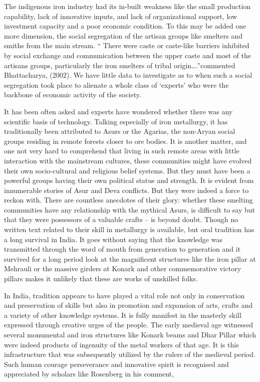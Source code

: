 The indigenous iron industry had its in-built weakness like the small production capability, lack of innovative inputs, and lack of organizational support, low investment capacity and a poor economic condition. To this may be added one more dimension, the social segregation of the artisan groups like smelters and smiths from the main stream. “ There were caste or caste-like barriers inhibited by social exchange and communication between the upper caste and most of the artisans groups, particularly the iron smelters of tribal origin….”commented Bhattacharya, (2002). We have little data to investigate as to when such a social segregation took place to alienate a whole class of `experts' who were the backbone of economic activity of the society. 

It has been often asked and experts have wondered whether there was any scientific basis of technology. Talking especially of iron metallurgy, it has traditionally been attributed to Asurs or the Agarias, the non-Aryan social groups residing in remote forests closer to ore bodies. It is another matter, and one not very hard to comprehend that living in such remote areas with little interaction with the mainstream cultures, these communities might have evolved their own socio-cultural and religious belief systems. But they must have been a powerful groups having their own political status and strength. It is evident from innumerable stories of Asur and Deva conflicts. But they were indeed a force to reckon with. There are countless anecdotes of their glory: whether these smelting communities have any relationship with the mythical Asurs, is difficult to say but that they were possessors of a valuable crafts – is beyond doubt. Though no written text related to their skill in metallurgy is available, but oral tradition has a long survival in India. It goes without saying that the knowledge was transmitted through the word of mouth from generation to generation and it survived for a long period look at the magnificent structures like the iron pillar at Mehrauli or the massive girders at Konark and other commemorative victory pillars makes it unlikely that these are works of unskilled folks.

In India, tradition appears to have played a vital role not only in conservation and preservation of skills but also in promotion and expansion of arts, crafts and a variety of other knowledge systems. It is fully manifest in the masterly skill expressed through creative urges of the people. The early medieval age witnessed several monumental and iron structures like Konark beams and Dhar Pillar which were indeed products of ingenuity of the metal workers of that age. It is this infrastructure that was subsequently utilized by the rulers of the medieval period. Such human courage perseverance and innovative spirit is recognised and appreciated by scholars like Rosenberg in his comment,

